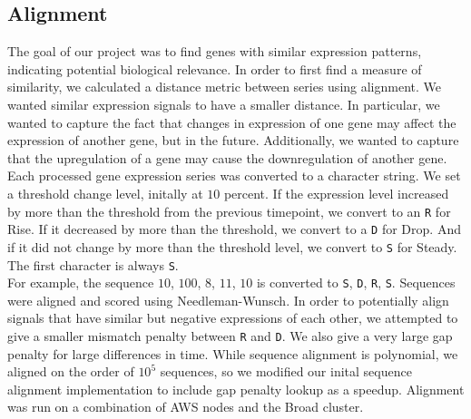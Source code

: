 \documentclass[aps,prd,final,onecolumn,a4paper,10pt]{revtex4}
\begin{document}
\subsection{Alignment}

The goal of our project was to find genes with similar expression patterns, indicating potential biological relevance.
In order to first find a measure of similarity, we calculated a distance metric between series using alignment.
We wanted similar expression signals to have a smaller distance. In particular, we wanted to capture the fact that changes in expression of one gene may affect the expression of another gene, but in the future. Additionally, we wanted to capture that the upregulation of a gene may cause the downregulation of another gene.
\\

Each processed gene expression series was converted to a character string.
We set a threshold change level, initally at $10$ percent.
If the expression level increased by more than the threshold from the previous timepoint, we convert to an \verb!R! for Rise.
If it decreased by more than the threshold, we convert to a \verb!D! for Drop.
And if it did not change by more than the threshold level, we convert to \verb!S! for Steady. The first character is always \verb!S!.\\

For example, the sequence $10$, $100$, $8$, $11$, $10$ is converted to \verb!S!, \verb!D!, \verb!R!, \verb!S!. Sequences were aligned and scored using Needleman-Wunsch.
In order to potentially align signals that have similar but negative expressions of each other, we attempted to give a smaller mismatch penalty between \verb!R! and \verb!D!.
We also give a very large gap penalty for large differences in time.
While sequence alignment is polynomial, we aligned on the order of $10^5$ sequences, so we modified our inital sequence alignment implementation to include gap penalty lookup as a speedup.
Alignment was run on a combination of AWS nodes and the Broad cluster.
\end{document}
